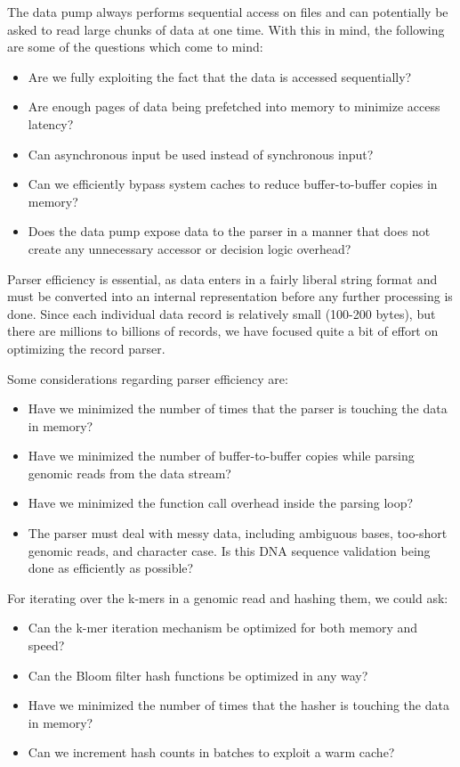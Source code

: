 \documentclass{article}
\begin{document}
The data pump always performs sequential access on files and can potentially be
asked to read large chunks of data at one time. With this in mind, the
following are some of the questions which come to mind:
\begin{itemize}
\item Are we fully exploiting the fact that the data is accessed sequentially?
\item Are enough pages of data being prefetched into memory to minimize access
latency?
\item Can asynchronous input be used instead of synchronous input?
\item Can we efficiently bypass system caches to reduce buffer-to-buffer copies
in memory?
\item Does the data pump expose data to the parser in a manner that
does not create any unnecessary accessor or decision logic overhead?
\end{itemize}

Parser efficiency is essential, as data enters in a fairly liberal
string format and must be converted into an internal representation before
any further processing is done.  Since each individual data record is
relatively small (100-200 bytes), but there are millions to billions of
records, we have focused quite a bit of effort on optimizing the
record parser.

Some considerations regarding parser efficiency are:
\begin{itemize}
\item Have we minimized the number of times that the parser is touching the 
data in memory?
\item Have we minimized the number of buffer-to-buffer copies while parsing 
genomic reads from the data stream?
\item Have we minimized the function call overhead inside the parsing loop?
\item The parser must deal with messy data, including ambiguous bases,
too-short genomic reads, and character case.  Is this DNA sequence validation being done as efficiently as possible?
\end{itemize}

For iterating over the k-mers in a genomic read and hashing them, we could ask:
\begin{itemize}
\item Can the k-mer iteration mechanism be optimized for both memory and speed?
\item Can the Bloom filter hash functions be optimized in any way?
\item Have we minimized the number of times that the hasher is touching the 
data in memory?
\item Can we increment hash counts in batches to exploit a warm cache?
\end{itemize}
\end{document}
